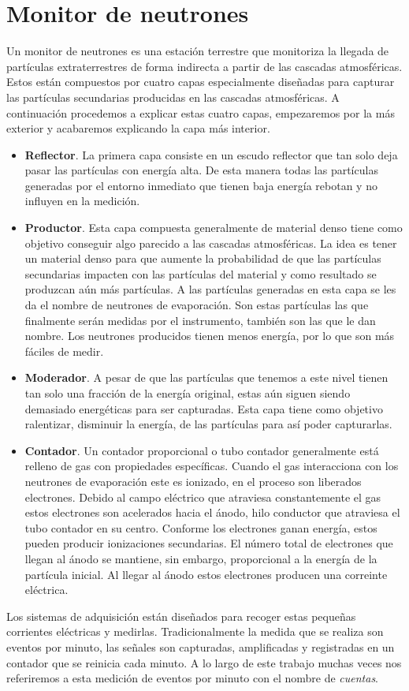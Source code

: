 \section{Monitor de neutrones}
	Un monitor de neutrones es una estación terrestre que monitoriza la llegada de partículas extraterrestres de forma indirecta a partir de las
	cascadas atmosféricas. Estos están compuestos por cuatro capas especialmente diseñadas para capturar las partículas secundarias producidas en
	las cascadas atmosféricas. A continuación procedemos a explicar estas cuatro capas, empezaremos por la más exterior y acabaremos explicando la
	capa más interior.
	\begin{itemize}
		\item	\textbf{Reflector}. La primera capa consiste en un escudo reflector que tan solo deja pasar las partículas con energía alta.
			De esta manera todas las partículas generadas por el entorno inmediato que tienen baja energía rebotan y no influyen en la
			medición.
		\item	\textbf{Productor}. Esta capa compuesta generalmente de material denso tiene como objetivo conseguir algo parecido a las
			cascadas atmosféricas. La idea es tener un material denso para que aumente la probabilidad de que las partículas secundarias
			impacten con las partículas del material y como resultado se produzcan aún más partículas. A las partículas generadas en esta
			capa se les da el nombre de neutrones de evaporación. Son estas partículas las que finalmente serán medidas por el
			instrumento, también son las que le dan nombre. Los neutrones producidos tienen menos energía, por lo que son más fáciles de
			medir.
		\item	\textbf{Moderador}. A pesar de que las partículas que tenemos a este nivel tienen tan solo una fracción de la energía
			original, estas aún siguen siendo demasiado energéticas para ser capturadas. Esta capa tiene como objetivo ralentizar,
			disminuir la energía, de las partículas para así poder capturarlas.
		\item	\textbf{Contador}. Un contador proporcional o tubo contador generalmente está relleno de gas con propiedades específicas.
			Cuando el gas interacciona con los neutrones de evaporación este es ionizado, en el proceso son liberados electrones. Debido
			al campo eléctrico que atraviesa constantemente el gas estos electrones son acelerados hacia el ánodo, hilo conductor que
			atraviesa el tubo contador en su centro. Conforme los electrones ganan energía, estos pueden producir ionizaciones
			secundarias. El número total de electrones que llegan al ánodo se mantiene, sin embargo, proporcional a la energía de la
			partícula inicial. Al llegar al ánodo estos electrones producen una correinte eléctrica. 

	\end{itemize}
	\par
	Los sistemas de adquisición están diseñados para recoger estas pequeñas corrientes eléctricas y medirlas. Tradicionalmente la medida que se
	realiza son eventos por minuto, las señales son capturadas, amplificadas y registradas en un contador que se reinicia cada minuto. A lo largo
	de este trabajo muchas veces nos referiremos a esta medición de eventos por minuto con el nombre de \emph{cuentas}. 

